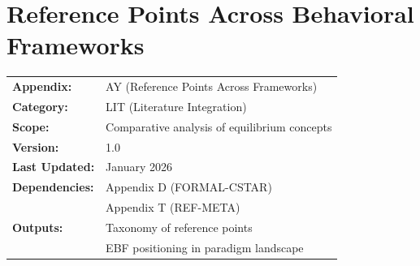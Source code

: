%
%
%
%
%

\section{Reference Points Across Behavioral Frameworks}
\label{app:lit-paradigms}



\begin{tcolorbox}[colback=blue!5!white, colframe=blue!75!black,
    title=\textbf{Appendix AY: LIT-PARADIGMS}]

\begin{tabular}{@{}ll@{}}
\textbf{Appendix:} & AY (Reference Points Across Frameworks) \\
\textbf{Category:} & LIT (Literature Integration) \\
\textbf{Scope:} & Comparative analysis of equilibrium concepts \\
\textbf{Version:} & 1.0 \\
\textbf{Last Updated:} & January 2026 \\
\textbf{Dependencies:} & Appendix D (FORMAL-CSTAR) \\
                       & Appendix T (REF-META) \\
\textbf{Outputs:} & Taxonomy of reference points \\
                  & EBF positioning in paradigm landscape \\
\end{tabular}

\end{tcolorbox}

